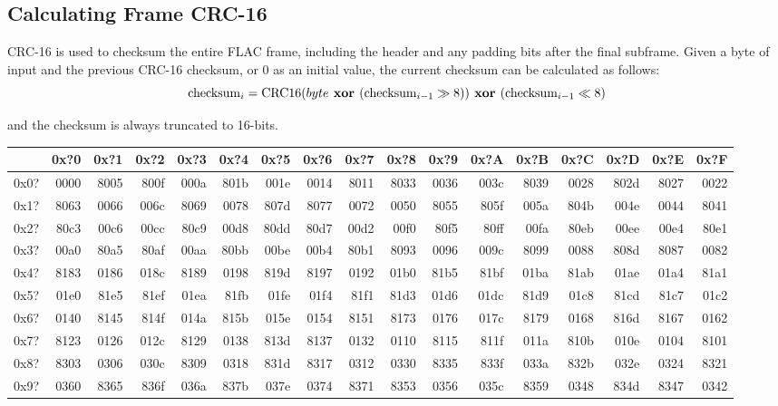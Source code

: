 \subsection{Calculating Frame CRC-16}
CRC-16 is used to checksum the entire FLAC frame, including the header
and any padding bits after the final subframe.
Given a byte of input and the previous CRC-16 checksum,
or 0 as an initial value, the current checksum can be calculated as follows:
\begin{equation}
\text{checksum}_i = \text{CRC16}(byte\textbf{ xor }(\text{checksum}_{i - 1} \gg 8 ))\textbf{ xor }(\text{checksum}_{i - 1} \ll 8)
\end{equation}
\par
\noindent
and the checksum is always truncated to 16-bits.
\begin{table}[h]
{\ttfamily
\begin{tabular}{|r||r|r|r|r|r|r|r|r|r|r|r|r|r|r|r|r|}
\hline
 & 0x?0 & 0x?1 & 0x?2 & 0x?3 & 0x?4 & 0x?5 & 0x?6 & 0x?7 & 0x?8 & 0x?9 & 0x?A & 0x?B & 0x?C & 0x?D & 0x?E & 0x?F \\
\hline
0x0? & 0000 & 8005 & 800f & 000a & 801b & 001e & 0014 & 8011 & 8033 & 0036 & 003c & 8039 & 0028 & 802d & 8027 & 0022 \\
0x1? & 8063 & 0066 & 006c & 8069 & 0078 & 807d & 8077 & 0072 & 0050 & 8055 & 805f & 005a & 804b & 004e & 0044 & 8041 \\
0x2? & 80c3 & 00c6 & 00cc & 80c9 & 00d8 & 80dd & 80d7 & 00d2 & 00f0 & 80f5 & 80ff & 00fa & 80eb & 00ee & 00e4 & 80e1 \\
0x3? & 00a0 & 80a5 & 80af & 00aa & 80bb & 00be & 00b4 & 80b1 & 8093 & 0096 & 009c & 8099 & 0088 & 808d & 8087 & 0082 \\
0x4? & 8183 & 0186 & 018c & 8189 & 0198 & 819d & 8197 & 0192 & 01b0 & 81b5 & 81bf & 01ba & 81ab & 01ae & 01a4 & 81a1 \\
0x5? & 01e0 & 81e5 & 81ef & 01ea & 81fb & 01fe & 01f4 & 81f1 & 81d3 & 01d6 & 01dc & 81d9 & 01c8 & 81cd & 81c7 & 01c2 \\
0x6? & 0140 & 8145 & 814f & 014a & 815b & 015e & 0154 & 8151 & 8173 & 0176 & 017c & 8179 & 0168 & 816d & 8167 & 0162 \\
0x7? & 8123 & 0126 & 012c & 8129 & 0138 & 813d & 8137 & 0132 & 0110 & 8115 & 811f & 011a & 810b & 010e & 0104 & 8101 \\
0x8? & 8303 & 0306 & 030c & 8309 & 0318 & 831d & 8317 & 0312 & 0330 & 8335 & 833f & 033a & 832b & 032e & 0324 & 8321 \\
0x9? & 0360 & 8365 & 836f & 036a & 837b & 037e & 0374 & 8371 & 8353 & 0356 & 035c & 8359 & 0348 & 834d & 8347 & 0342 \\

\end{tabular}}
\end{table}
